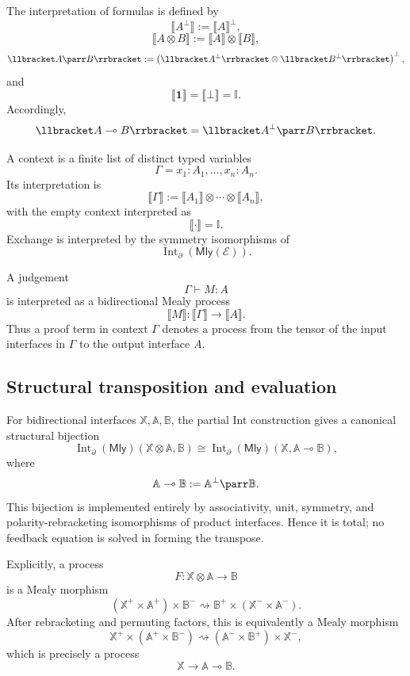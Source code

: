 The interpretation of formulas is defined by
\[
\llbracket A^\bot\rrbracket
:=
\llbracket A\rrbracket^\bot,
\]
\[
\llbracket A\otimes B\rrbracket
:=
\llbracket A\rrbracket\otimes\llbracket B\rrbracket,
\]
\[
\llbracket A\parr B\rrbracket
:=
\left(
\llbracket A^\bot\rrbracket
\otimes
\llbracket B^\bot\rrbracket
\right)^\bot,
\]
and
\[
\llbracket \mathbf 1\rrbracket
=
\llbracket \bot\rrbracket
=
\mathbb I.
\]
Accordingly,
\[
\llbracket A\multimap B\rrbracket
=
\llbracket A^\bot\parr B\rrbracket.
\]

A context is a finite list of distinct typed variables
\[
\Gamma=x_1:A_1,\ldots,x_n:A_n.
\]
Its interpretation is
\[
\llbracket \Gamma\rrbracket
:=
\llbracket A_1\rrbracket\otimes\cdots\otimes\llbracket A_n\rrbracket,
\]
with the empty context interpreted as
\[
\llbracket \cdot\rrbracket=\mathbb I.
\]
Exchange is interpreted by the symmetry isomorphisms of
\[
\operatorname{Int}_{\partial}(\mathsf{Mly}(\mathcal E)).
\]

A judgement
\[
\Gamma\vdash M:A
\]
is interpreted as a bidirectional Mealy process
\[
\llbracket M\rrbracket:
\llbracket \Gamma\rrbracket
\longrightarrow
\llbracket A\rrbracket.
\]
Thus a proof term in context \(\Gamma\) denotes a process from the tensor of
the input interfaces in \(\Gamma\) to the output interface \(A\).

\subsection{Structural transposition and evaluation}

For bidirectional interfaces \(\mathbb X,\mathbb A,\mathbb B\), the partial
Int construction gives a canonical structural bijection
\[
\operatorname{Int}_{\partial}(\mathsf{Mly})(\mathbb X\otimes\mathbb A,\mathbb B)
\cong
\operatorname{Int}_{\partial}(\mathsf{Mly})(\mathbb X,\mathbb A\multimap\mathbb B),
\]
where
\[
\mathbb A\multimap\mathbb B:=\mathbb A^\bot\parr\mathbb B.
\]
This bijection is implemented entirely by associativity, unit, symmetry, and
polarity-rebracketing isomorphisms of product interfaces.  Hence it is total;
no feedback equation is solved in forming the transpose.

Explicitly, a process
\[
F:\mathbb X\otimes\mathbb A\to\mathbb B
\]
is a Mealy morphism
\[
(\mathbb X^+\times\mathbb A^+)\times\mathbb B^-
\rightsquigarrow
\mathbb B^+\times(\mathbb X^-\times\mathbb A^-).
\]
After rebracketing and permuting factors, this is equivalently a Mealy
morphism
\[
\mathbb X^+\times(\mathbb A^+\times\mathbb B^-)
\rightsquigarrow
(\mathbb A^-\times\mathbb B^+)\times\mathbb X^-,
\]
which is precisely a process
\[
\mathbb X\to\mathbb A\multimap\mathbb B.
\]

